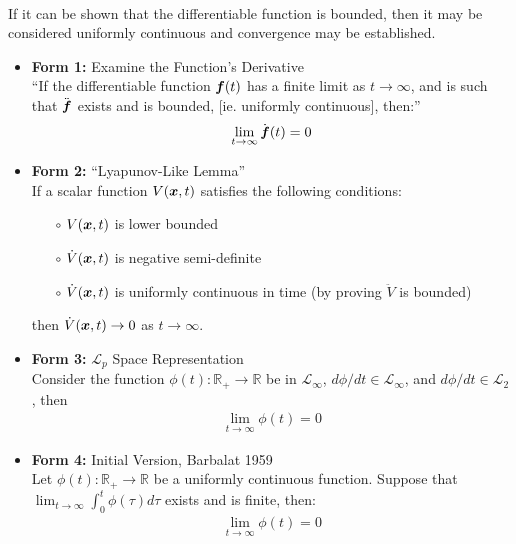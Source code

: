 \documentclass[12pt]{ucthesis}
\begin{document}
\begin{lem} ~ \label{lem: barbalat}\\
If it can be shown that the differentiable function is bounded, then it may be considered uniformly continuous and convergence may be established.
	\begin{itemize}[labelindent=\parindent,leftmargin=\parindent,noitemsep,topsep=0pt,parsep=0pt,partopsep=0pt]%
		\item{\textbf{Form 1:} Examine the Function's Derivative \alignright \citet{Slotine1991}\\
		``If the differentiable function $\boldsymbol{f}(t)$ has a finite limit as $t \rightarrow \infty$, and is such that $\ddot{\boldsymbol{f}}$ exists and is bounded, [ie. uniformly continuous], then:''
		\begin{align*} \lim_{t \rightarrow \infty}\dot{\boldsymbol{f}}(t)= 0 \end{align*}
		}
		\item{\textbf{Form 2:} ``Lyapunov-Like Lemma'' \alignright \citet{Slotine1991}\\
		If a scalar function $V(\boldsymbol{x},t)$ satisfies the following conditions:
			\begin{itemize}[labelindent=\parindent,leftmargin=4em,noitemsep,topsep=0pt,parsep=0pt,partopsep=0pt]
				\item[$\circ$] $V(\boldsymbol{x},t)$ is lower bounded
				\item[$\circ$] $\dot{V}(\boldsymbol{x},t)$ is negative semi-definite
				\item[$\circ$] $\dot{V}(\boldsymbol{x},t)$ is uniformly continuous in time (by proving $\ddot{V}$ is bounded)
			\end{itemize}
		then $\dot{V}(\boldsymbol{x},t) \rightarrow 0$ as $t \rightarrow \infty$.
		}
		\item{\textbf{Form 3:} $\mathcal{L}_p$ Space Representation \alignright \citet[A.2.2.3]{Farrell2006}\\
		Consider the function $\phi(t): \mathbb{R}_+ \rightarrow \mathbb{R}$ be in $\mathcal{L}_{\infty}$, ${d{\phi}/dt} \in \mathcal{L}_{\infty}$, and ${d{\phi}/dt} \in \mathcal{L}_2$, then
			\begin{align*} \lim_{t \rightarrow \infty}\phi(t)= 0 \end{align*}
		}
		\item{\textbf{Form 4:} Initial Version, Barbalat 1959 \alignright \citet[Lemma 4.2]{Khalil1996} \\
		Let $\phi(t): \mathbb{R}_+ \rightarrow \mathbb{R}$ be a uniformly continuous function. Suppose that $ \lim_{t \rightarrow \infty}\int_0^t \phi(\tau) d\tau $ exists and is finite, then: 
			\begin{align*} \lim_{t \rightarrow \infty} \phi(t)= 0 \end{align*}
		}
	\end{itemize}
\end{lem}
\end{document}
